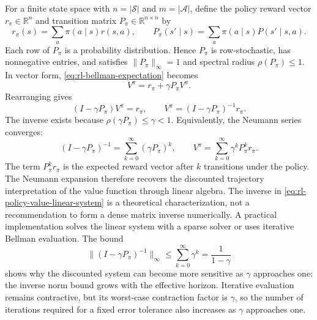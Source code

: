 For a finite state space with $n=|\mathcal{S}|$ and $m=|\mathcal{A}|$, define
the policy reward vector $r_\pi\in\mathbb{R}^{n}$ and transition matrix
$P_\pi\in\mathbb{R}^{n\times n}$ by
\begin{equation}
    r_\pi(s)=\sum_a\pi(a\mid s)r(s,a),
    \qquad
    P_\pi(s'\mid s)=\sum_a\pi(a\mid s)P(s'\mid s,a).
    \label{eq:rl-policy-induced-model}
\end{equation}
Each row of $P_\pi$ is a probability distribution. Hence $P_\pi$ is
row-stochastic, has nonnegative entries, and satisfies
$\|P_\pi\|_\infty=1$ and spectral radius $\rho(P_\pi)\leq1$. In vector form,
\cref{eq:rl-bellman-expectation} becomes
\begin{equation}
    V^\pi=r_\pi+\gamma P_\pi V^\pi.
    \label{eq:rl-bellman-vector}
\end{equation}
Rearranging gives
\begin{equation}
    (I-\gamma P_\pi)V^\pi=r_\pi,
    \qquad
    V^\pi=(I-\gamma P_\pi)^{-1}r_\pi.
    \label{eq:rl-policy-value-linear-system}
\end{equation}
The inverse exists because
$\rho(\gamma P_\pi)\leq\gamma<1$. Equivalently, the Neumann series converges:
\begin{equation}
    (I-\gamma P_\pi)^{-1}
    =\sum_{k=0}^{\infty}(\gamma P_\pi)^k,
    \qquad
    V^\pi=\sum_{k=0}^{\infty}\gamma^kP_\pi^k r_\pi.
    \label{eq:rl-neumann-series}
\end{equation}
The term $P_\pi^k r_\pi$ is the expected reward vector after $k$ transitions
under the policy. The Neumann expansion therefore recovers the discounted
trajectory interpretation of the value function through linear algebra.
The inverse in \cref{eq:rl-policy-value-linear-system} is a theoretical characterization, not a recommendation to form a dense matrix inverse numerically. A practical implementation solves the linear system with a sparse solver or uses iterative Bellman evaluation. The bound
\begin{equation}
    \|(I-\gamma P_\pi)^{-1}\|_\infty
    \leq\sum_{k=0}^{\infty}\gamma^k
    =\frac{1}{1-\gamma}
    \label{eq:rl-policy-evaluation-conditioning}
\end{equation}
shows why the discounted system can become more sensitive as $\gamma$ approaches one: the inverse norm bound grows with the effective horizon. Iterative evaluation remains contractive, but its worst-case contraction factor is $\gamma$, so the number of iterations required for a fixed error tolerance also increases as $\gamma$ approaches one.

